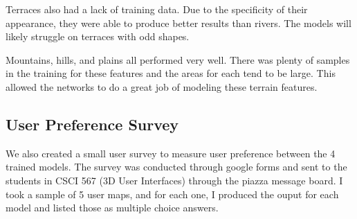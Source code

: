 \documentclass[twocolumn]{article}
\begin{document}
	Terraces also had a lack of training data. Due to the specificity of their appearance, they were able to produce better results than rivers. The models will likely struggle on terraces with odd shapes.

	Mountains, hills, and plains all performed very well. There was plenty of samples in the training for these features and the areas for each tend to be large. This allowed the networks to do a great job of modeling these terrain features.

	\subsection{User Preference Survey}
	
	We also created a small user survey to measure user preference between the 4 trained models. The survey was conducted through google forms and sent to the students in CSCI 567 (3D User Interfaces) through the piazza message board. I took a sample of 5 user maps, and for each one, I produced the ouput for each model and listed those as multiple choice answers.
\end{document}
